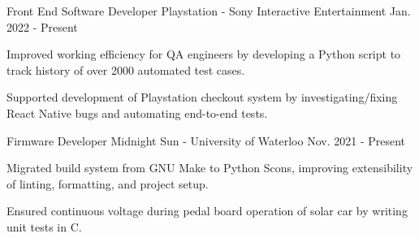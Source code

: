 

\begin{cventries}


  \cventry
    {Front End Software Developer} %
    {Playstation - Sony Interactive Entertainment} %
    {} %
    {Jan. 2022 - Present} %
    {
      \begin{cvitems} %
        \item {Improved working efficiency for QA engineers by developing a Python script to track history of over 2000 automated test cases.}
        \item {Supported development of Playstation checkout system by investigating/fixing React Native bugs and automating end-to-end tests.}
      \end{cvitems}
    }


  \cventry
    {Firmware Developer} %
    {Midnight Sun - University of Waterloo} %
    {} %
    {Nov. 2021 - Present} %
    {
      \begin{cvitems} %
        \item {Migrated build system from GNU Make to Python Scons, improving extensibility of linting, formatting, and project setup.}
        \item {Ensured continuous voltage during pedal board operation of solar car by writing unit tests in C.}
      \end{cvitems}
    }


\end{cventries}
